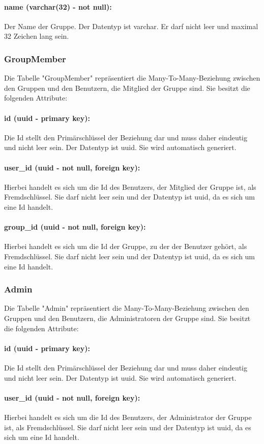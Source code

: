 \documentclass[parskip=full]{scrartcl}
\begin{document}
\paragraph{name (varchar(32) - not null):} Der Name der Gruppe. Der Datentyp ist \Gls{varchar}. Er darf nicht leer und maximal 32 Zeichen lang sein.
\newpage
\subsubsection{GroupMember}
Die Tabelle "GroupMember" repräsentiert die Many-To-Many-Beziehung zwischen den Gruppen und den Benutzern, die Mitglied der Gruppe sind. Sie besitzt die folgenden Attribute:
\paragraph{id (uuid - primary key):} Die Id stellt den Primärschlüssel der Beziehung dar und muss daher eindeutig und nicht leer sein. Der Datentyp ist \Gls{uuid}. Sie wird automatisch generiert.
\paragraph{user\_id (uuid - not null, foreign key):} Hierbei handelt es sich um die Id des Benutzers, der Mitglied der Gruppe ist, als Fremdschlüssel. Sie darf nicht leer sein und der Datentyp ist \Gls{uuid}, da es sich um eine Id handelt.
\paragraph{group\_id (uuid - not null, foreign key):} Hierbei handelt es sich um die Id der Gruppe, zu der der Benutzer gehört, als Fremdschlüssel. Sie darf nicht leer sein und der Datentyp ist \Gls{uuid}, da es sich um eine Id handelt.
\newpage
\subsubsection{Admin}
Die Tabelle "Admin" repräsentiert die Many-To-Many-Beziehung zwischen den Gruppen und den Benutzern, die Administratoren der Gruppe sind. Sie besitzt die folgenden Attribute:
\paragraph{id (uuid - primary key):} Die Id stellt den Primärschlüssel der Beziehung dar und muss daher eindeutig und nicht leer sein. Der Datentyp ist \Gls{uuid}. Sie wird automatisch generiert.
\paragraph{user\_id (uuid - not null, foreign key):} Hierbei handelt es sich um die Id des Benutzers, der Administrator der Gruppe ist, als Fremdschlüssel. Sie darf nicht leer sein und der Datentyp ist \Gls{uuid}, da es sich um eine Id handelt.
\end{document}
